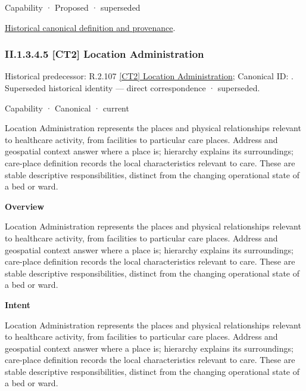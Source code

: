 \label{element:718ebe1fa8d44ad9a6632a5932277a8e}
{\small Capability · Proposed · superseded}\par
\href{../../../../../../../continuum/strategy/capability/718ebe1fa8d44ad9a6632a5932277a8e.md}{Historical canonical definition and provenance}.\par
\subsubsection*{II.1.3.4.5 [CT2] Location Administration}
\label{navigation:II.1.3.4.5}

{\small Historical predecessor: R.2.107 \hyperref[element:d412aff3a5c64e6aaba910d4c2c9356d]{[CT2] Location Administration}; Canonical ID: \texttt{}. Superseded historical identity — direct correspondence · superseded.}\par
\label{element:c410005667444f99a221483bf577fad2}
{\small Capability · Canonical · current}\par

Location Administration represents the places and physical relationships relevant to healthcare activity, from facilities to particular care places. Address and geospatial context answer where a place is; hierarchy explains its surroundings; care-place definition records the local characteristics relevant to care. These are stable descriptive responsibilities, distinct from the changing operational state of a bed or ward.



\textbf{Overview}



Location Administration represents the places and physical relationships relevant to healthcare activity, from facilities to particular care places. Address and geospatial context answer where a place is; hierarchy explains its surroundings; care-place definition records the local characteristics relevant to care. These are stable descriptive responsibilities, distinct from the changing operational state of a bed or ward.



\textbf{Intent}



Location Administration represents the places and physical relationships relevant to healthcare activity, from facilities to particular care places. Address and geospatial context answer where a place is; hierarchy explains its surroundings; care-place definition records the local characteristics relevant to care. These are stable descriptive responsibilities, distinct from the changing operational state of a bed or ward.



